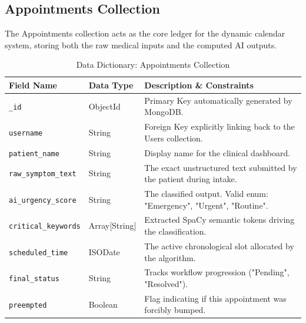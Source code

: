 \documentclass[12pt,a4paper]{report}
\begin{document}
\subsection{Appointments Collection}
The Appointments collection acts as the core ledger for the dynamic calendar system, storing both the raw medical inputs and the computed AI outputs.
\begin{table}[H]
\centering
\caption{Data Dictionary: Appointments Collection}
\begin{tabularx}{\textwidth}{|l|l|X|}
\hline
\textbf{Field Name} & \textbf{Data Type} & \textbf{Description \& Constraints} \\ \hline
\texttt{\_id} & ObjectId & Primary Key automatically generated by MongoDB. \\ \hline
\texttt{username} & String & Foreign Key explicitly linking back to the Users collection. \\ \hline
\texttt{patient\_name} & String & Display name for the clinical dashboard. \\ \hline
\texttt{raw\_symptom\_text} & String & The exact unstructured text submitted by the patient during intake. \\ \hline
\texttt{ai\_urgency\_score} & String & The classified output. Valid enum: "Emergency", "Urgent", "Routine". \\ \hline
\texttt{critical\_keywords} & Array[String] & Extracted SpaCy semantic tokens driving the classification. \\ \hline
\texttt{scheduled\_time} & ISODate & The active chronological slot allocated by the algorithm. \\ \hline
\texttt{final\_status} & String & Tracks workflow progression ("Pending", "Resolved"). \\ \hline
\texttt{preempted} & Boolean & Flag indicating if this appointment was forcibly bumped. \\ \hline
\end{tabularx}
\end{table}
\end{document}
